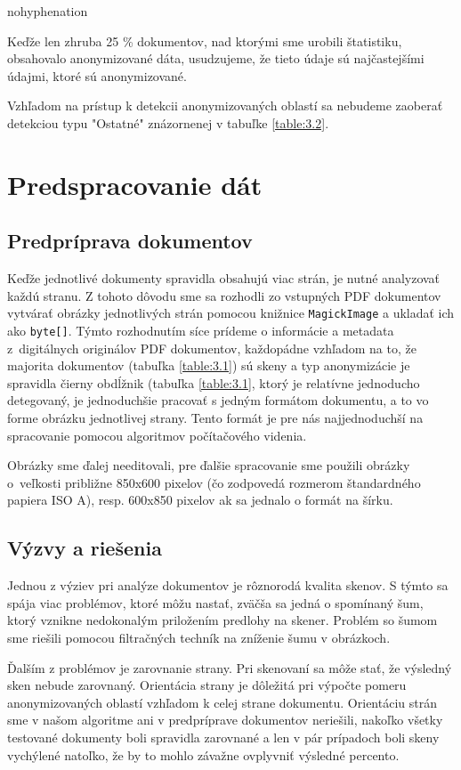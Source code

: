 \begin{hyphenrules}{nohyphenation}
\begin{figure}[H]
\begin{minipage}[b]{.3\linewidth}
\end{minipage}
\end{figure}

Keďže len zhruba 25 \% dokumentov, nad ktorými sme urobili štatistiku, obsahovalo anonymizované dáta, usudzujeme, že tieto údaje sú najčastejšími údajmi, ktoré sú anonymizované.
\newline

Vzhľadom na prístup k detekcii anonymizovaných oblastí sa nebudeme zaoberať detekciou typu "Ostatné" znázornenej v tabuľke \ref{table:3.2}.
\section{Predspracovanie dát}
\subsection{Predpríprava dokumentov}
Keďže jednotlivé dokumenty spravidla obsahujú viac strán, je nutné analyzovať každú stranu. Z tohoto dôvodu sme sa rozhodli zo vstupných PDF dokumentov vytvárať obrázky jednotlivých strán pomocou knižnice \texttt{MagickImage} a ukladať ich ako \texttt{byte[]}. Týmto rozhodnutím síce prídeme o informácie a metadata z~digitálnych originálov PDF dokumentov, každopádne vzhľadom na to, že majorita dokumentov (tabuľka \ref{table:3.1}) sú skeny a typ anonymizácie je spravidla čierny obdĺžnik (tabuľka \ref{table:3.1}, ktorý je relatívne jednoducho detegovaný, je jednoduchšie pracovať s jedným formátom dokumentu, a to vo forme obrázku jednotlivej strany. Tento formát je pre nás najjednoduchší na spracovanie pomocou algoritmov počítačového videnia. 
\newline

Obrázky sme ďalej needitovali, pre ďalšie spracovanie sme použili obrázky o~veľkosti približne 850x600 pixelov (čo zodpovedá rozmerom štandardného papiera ISO A\cite{prepressure}), resp. 600x850 pixelov ak sa jednalo o formát na šírku.

\subsection{Výzvy a riešenia}
Jednou z výziev pri analýze dokumentov je rôznorodá kvalita skenov. S týmto sa spája viac problémov, ktoré môžu nastať, zväčša sa jedná o spomínaný šum, ktorý vznikne nedokonalým priložením predlohy na skener. Problém so šumom sme riešili pomocou filtračných techník na zníženie šumu v obrázkoch.
\newline

Ďalším z problémov je zarovnanie strany. Pri skenovaní sa môže stať, že výsledný sken nebude zarovnaný. Orientácia strany je dôležitá pri výpočte pomeru anonymizovaných oblastí vzhľadom k celej strane dokumentu. Orientáciu strán sme v našom algoritme ani v predpríprave dokumentov neriešili, nakoľko všetky testované dokumenty boli spravidla zarovnané a len v pár prípadoch boli skeny vychýlené natoľko, že by to mohlo závažne ovplyvniť výsledné percento. 
\end{hyphenrules}
